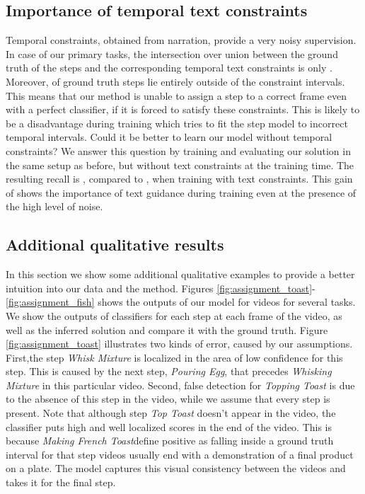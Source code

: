 \documentclass[10pt,twocolumn,letterpaper]{article}
\begin{document}
\subsection{Importance of temporal text constraints}
\label{subsec:constraints}
Temporal constraints, obtained from narration, provide a very noisy supervision.
In case of our primary tasks, the intersection over union between the ground truth of the steps and the corresponding temporal text constraints is only . Moreover,  of ground truth steps lie entirely outside of the constraint intervals.
This means that our method is unable to assign a step to a correct frame even with a perfect classifier, if it is forced to satisfy these constraints.
This is likely to be a disadvantage during training which tries to fit the step model to incorrect temporal intervals.
Could it be better to learn our model without temporal constraints?
We answer this question by training and evaluating our solution in the same setup as before, but without text constraints at the training time.
The resulting recall is , compared to , when training with text constraints.
This gain of  shows the importance of text guidance during training even at the presence of the high level of noise.

\subsection{Additional qualitative results}
\label{subsec:results}
In this section we show some additional qualitative examples to provide a better intuition into our data and the method.
Figures \ref{fig:assignment_toast}-\ref{fig:assignment_fish} shows the outputs of our model for videos for several tasks.
We show the outputs of classifiers for each step at each frame of the video, as well as the inferred solution and compare it with the ground truth.
Figure \ref{fig:assignment_toast} illustrates two kinds of error, caused by our assumptions.
First,the step \textit{Whisk Mixture} is localized in the area of low confidence for this step.
This is caused by the next step, \textit{Pouring Egg}, that precedes \textit{Whisking Mixture} in this particular video.
Second, false detection for \textit{Topping Toast} is due to the absence of this step in the video, while we assume that every step is present.
Note that although step \textit{Top Toast} doesn't appear in the video, the classifier puts high and well localized scores in the end of the video.
This is because \textit{Making French Toast}define positive as falling inside a ground truth interval for that step videos usually end with a demonstration of a final product on a plate.
The model captures this visual consistency between the videos and takes it for the final step.
\end{document}
